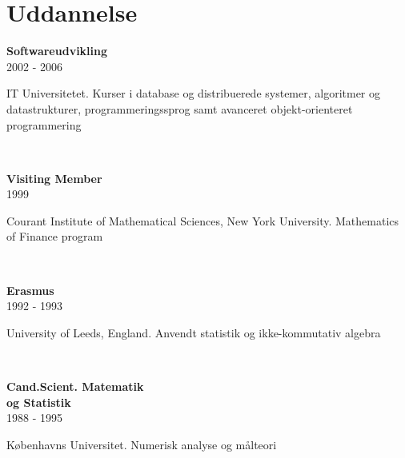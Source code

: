 \documentclass[10pt, a4paper]{article}
\begin{document}
\section{Uddannelse}
\begin{Row}%
  \begin{Cell}{1}
    \textbf{Softwareudvikling} \\[1ex]
    2002 - 2006 
  \end{Cell}
  \begin{Cell}{3}
    IT Universitetet. Kurser i database og distribuerede systemer, algoritmer og datastrukturer, programmeringssprog samt avanceret objekt-orienteret programmering
  \end{Cell}
\end{Row}
\\[0.5cm]
\begin{Row}%
  \begin{Cell}{1}
    \textbf{Visiting Member} \\[1ex]
    1999 
  \end{Cell}
  \begin{Cell}{3}
    Courant Institute of Mathematical Sciences, New York University. Mathematics of Finance program
  \end{Cell}
\end{Row}
\\[0.5cm]
\begin{Row}%
  \begin{Cell}{1}
    \textbf{Erasmus} \\[1ex]
    1992 - 1993 
  \end{Cell}
  \begin{Cell}{3}
    University of Leeds, England. Anvendt statistik og ikke-kommutativ algebra
  \end{Cell}
\end{Row}
\\[0.5cm]
\begin{Row}%
  \begin{Cell}{1}
    \textbf{Cand.Scient. Matematik \\ og Statistik} \\[1ex]
    1988 - 1995 
  \end{Cell}
  \begin{Cell}{3}
    Københavns Universitet. Numerisk analyse og målteori
  \end{Cell}
\end{Row}
\end{document}
